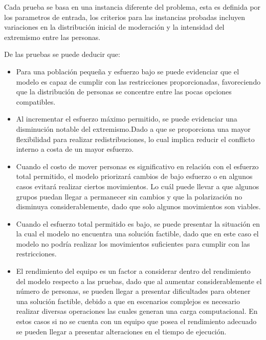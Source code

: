 \documentclass[11pt,letter]{article}
\begin{document}
Cada prueba se basa en una instancia diferente del problema, esta es definida por los parametros de entrada, los criterios para las instancias probadas incluyen variaciones en la distribución inicial de moderación y la intensidad del extremismo entre las personas.

De las pruebas se puede deducir que:
\begin{itemize}
    \item Para una población pequeña y esfuerzo bajo se puede evidenciar que el modelo es capaz de cumplir con las restricciones proporcionadas, favoreciendo que la distribución de personas se concentre entre las pocas opciones compatibles.
    
    \item Al incrementar el esfuerzo máximo permitido, se puede evidenciar una disminución notable del extremismo.Dado a que se proporciona una mayor flexibilidad para realizar redistribuciones, lo cual implica reducir el conflicto interno a costa de un mayor esfuerzo.
    
    \item Cuando el costo de mover personas es significativo en relación con el esfuerzo total permitido, el modelo priorizará cambios de bajo esfuerzo o en algunos casos evitará realizar ciertos movimientos. Lo cuál puede llevar a que algunos grupos puedan llegar a permanecer sin cambios y que la polarización no disminuya considerablemente, dado que solo algunos movimientos son viables.

    \item Cuando el esfuerzo total permitido es bajo, se puede presentar la situación en la cual el modelo no encuentra una solución factible, dado que en este caso el modelo no podría realizar los movimientos suficientes para cumplir con las restricciones.

    \item El rendimiento del equipo es un factor a considerar dentro del rendimiento del modelo respecto a las pruebas, dado que al aumentar considerablemente el número de personas, se pueden llegar a presentar dificultades para obtener una solución factible, debido a que en escenarios complejos es necesario realizar diversas operaciones las cuales generan una carga computacional. En estos casos si no se cuenta con un equipo que posea el rendimiento adecuado se pueden llegar a presentar alteraciones en el tiempo de ejecución.
    

\end{itemize}
\end{document}
